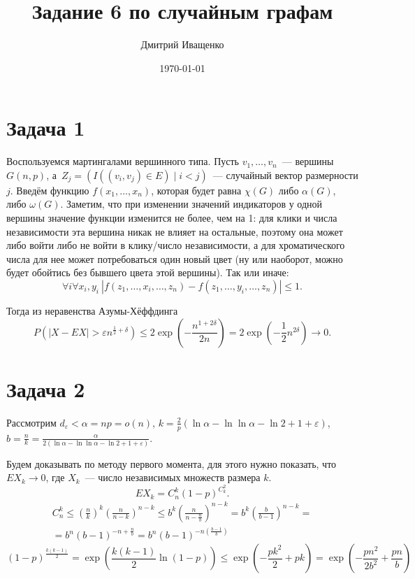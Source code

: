 \documentclass{article}
\theoremstyle{definition}
\theoremstyle{remark}
\renewcommand{\le}{\leqslant}
\newcommand{\eps}{\varepsilon}
\begin{document}
\title{Задание 6 по случайным графам}
\author{Дмитрий Иващенко}
\date{\today}
\maketitle

\section*{Задача 1}

Воспользуемся мартингалами вершинного типа. Пусть $v_1, \ldots, v_n$~--- вершины $G(n, p)$,
а~$Z_j = (I((v_i, v_j) \in E) \mid i < j)$~--- случайный вектор размерности $j$. Введём функцию
$f(x_1, \ldots, x_n)$, которая будет равна $\chi(G)$ либо $\alpha(G)$, либо $\omega(G)$. Заметим,
что при изменении значений индикаторов у одной вершины значение функции изменится не более, чем на
1: для клики и числа независимости эта вершина никак не влияет на остальные, поэтому она может либо
войти либо не войти в клику/число независимости, а для хроматического числа для нее может
потребоваться один новый цвет (ну или наоборот, можно будет обойтись без бывшего цвета этой
вершины). Так или иначе:
$$ \forall i \forall x_i, y_i\ |f(z_1, \ldots, x_i, \ldots, z_n) - f(z_1, \ldots, y_i, \ldots, z_n)|
\le 1. $$

Тогда из неравенства Азумы-Хёффдинга
$$P(|X - EX| > \eps n^{\frac{1}{2} + \delta}) \le 2\exp\left(-\frac{n^{1+2\delta}}{2n}\right) =
2\exp\left(-\frac{1}{2}n^{2\delta}\right) \rightarrow 0.$$

\section*{Задача 2}

Рассмотрим $d_\eps < \alpha = np = o(n)$, $k = \frac{2}{p}\left(\ln\alpha - \ln\ln\alpha - \ln 2 + 1
+ \eps \right)$, $b = \frac{n}{k} = \frac{\alpha}{2(\ln\alpha - \ln\ln\alpha - \ln 2 + 1 + \eps)}$.

Будем доказывать по методу первого момента, для этого нужно показать, что $EX_k \rightarrow 0$, где
$X_k$~--- число независимых множеств размера $k$.
$$EX_k = C_n^k (1 - p)^{C_k^2}.$$
\begin{multline*}
	C_n^k \le \left(\frac{n}{k}\right)^k \left(\frac{n}{n-k}\right)^{n-k} \le
	b^k \left(\frac{n}{n - \frac{n}{b}}\right)^{n-k} = b^k \left(\frac{b}{b-1}\right)^{n-k} =\\=
	b^n (b - 1)^{-n + \frac{n}{b}} = b^n (b - 1)^{-n\left(\frac{b-1}{b}\right)}
\end{multline*}
$$
	(1-p)^{\frac{k(k-1)}{2}} = \exp\left(\frac{k(k-1)}{2}\ln(1 - p)\right) \le
	\exp\left(-\frac{pk^2}{2} + pk\right) = \exp\left(-\frac{pn^2}{2b^2} + \frac{pn}{b}\right)
$$
\end{document}
